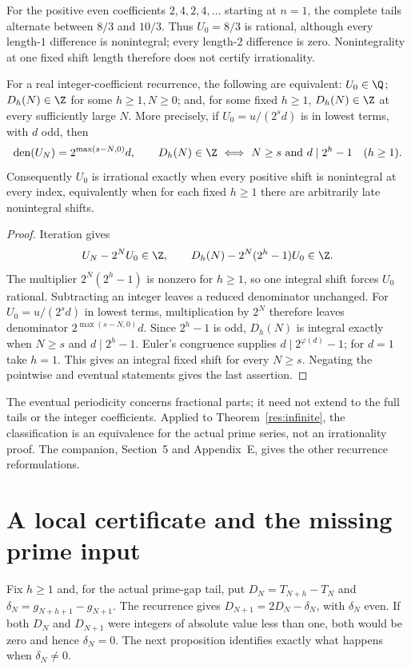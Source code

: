 \documentclass[11pt]{article}
\begin{document}
For the positive even coefficients $2,4,2,4,\ldots$ starting at $n=1$,
the complete tails alternate between $8/3$ and $10/3$.  Thus $U_0=8/3$
is rational, although every length-$1$ difference is nonintegral;
every length-$2$ difference is zero.  Nonintegrality at one fixed
shift length therefore does not certify irrationality.

\begin{theorem}\label{res:escape-irrational}
For a real integer-coefficient recurrence, the following are equivalent:
$U_0\in\Q$; $D_h(N)\in\Z$ for some $h\ge1,N\ge0$; and, for some fixed
$h\ge1$, $D_h(N)\in\Z$ at every sufficiently large $N$.
More precisely, if $U_0=u/(2^sd)$ is in lowest terms, with $d$ odd, then
\[
 \operatorname{den}(U_N)=2^{\max(s-N,0)}d,\qquad
 D_h(N)\in\Z\ \Longleftrightarrow\ N\ge s\ \text{and}\ d\mid2^h-1
 \quad(h\ge1).
\]
Consequently $U_0$ is irrational exactly when every positive shift is
nonintegral at every index, equivalently when for each fixed $h\ge1$
there are arbitrarily late nonintegral shifts.
\end{theorem}
\begin{proof}
Iteration gives
\[
 U_N-2^NU_0\in\Z,\qquad
 D_h(N)-2^N(2^h-1)U_0\in\Z.
\]
The multiplier $2^N(2^h-1)$ is nonzero for $h\ge1$, so one integral shift
forces $U_0$ rational.  Subtracting an integer leaves a reduced
denominator unchanged.  For $U_0=u/(2^sd)$ in lowest terms, multiplication
by $2^N$ therefore leaves denominator $2^{\max(s-N,0)}d$.
Since $2^h-1$ is odd, $D_h(N)$ is integral exactly when
$N\ge s$ and $d\mid2^h-1$.  Euler's congruence supplies $d\mid2^{\varphi(d)}-1$;
for $d=1$ take $h=1$.  This gives an integral fixed shift for every $N\ge s$.
Negating the pointwise and eventual statements gives the last assertion.
\end{proof}
The eventual periodicity concerns fractional parts; it need not extend
to the full tails or the integer coefficients.  Applied to
Theorem~\ref{res:infinite}, the classification is an equivalence for the
actual prime series, not an irrationality proof.  The companion,
Section~5 and Appendix~E, gives the other recurrence reformulations.

\section{A local certificate and the missing prime input}\label{sec:local-certificate}
Fix $h\ge1$ and, for the actual prime-gap tail, put
$D_N=T_{N+h}-T_N$ and $\delta_N=g_{N+h+1}-g_{N+1}$.
The recurrence gives $D_{N+1}=2D_N-\delta_N$, with $\delta_N$ even.
If both $D_N$ and $D_{N+1}$ were integers of absolute value less than
one, both would be zero and hence $\delta_N=0$.
The next proposition identifies exactly what happens when
$\delta_N\ne0$.
\end{document}
